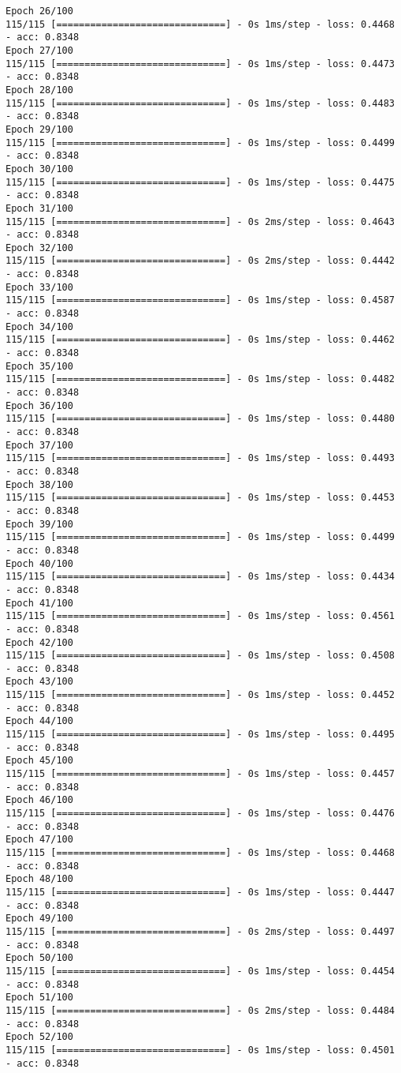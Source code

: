 \documentclass[11pt]{article}
\begin{document}
\begin{Verbatim}[commandchars=\\\{\}]
Epoch 26/100
115/115 [==============================] - 0s 1ms/step - loss: 0.4468 - acc: 0.8348
Epoch 27/100
115/115 [==============================] - 0s 1ms/step - loss: 0.4473 - acc: 0.8348
Epoch 28/100
115/115 [==============================] - 0s 1ms/step - loss: 0.4483 - acc: 0.8348
Epoch 29/100
115/115 [==============================] - 0s 1ms/step - loss: 0.4499 - acc: 0.8348
Epoch 30/100
115/115 [==============================] - 0s 1ms/step - loss: 0.4475 - acc: 0.8348
Epoch 31/100
115/115 [==============================] - 0s 2ms/step - loss: 0.4643 - acc: 0.8348
Epoch 32/100
115/115 [==============================] - 0s 2ms/step - loss: 0.4442 - acc: 0.8348
Epoch 33/100
115/115 [==============================] - 0s 1ms/step - loss: 0.4587 - acc: 0.8348
Epoch 34/100
115/115 [==============================] - 0s 1ms/step - loss: 0.4462 - acc: 0.8348
Epoch 35/100
115/115 [==============================] - 0s 1ms/step - loss: 0.4482 - acc: 0.8348
Epoch 36/100
115/115 [==============================] - 0s 1ms/step - loss: 0.4480 - acc: 0.8348
Epoch 37/100
115/115 [==============================] - 0s 1ms/step - loss: 0.4493 - acc: 0.8348
Epoch 38/100
115/115 [==============================] - 0s 1ms/step - loss: 0.4453 - acc: 0.8348
Epoch 39/100
115/115 [==============================] - 0s 1ms/step - loss: 0.4499 - acc: 0.8348
Epoch 40/100
115/115 [==============================] - 0s 1ms/step - loss: 0.4434 - acc: 0.8348
Epoch 41/100
115/115 [==============================] - 0s 1ms/step - loss: 0.4561 - acc: 0.8348
Epoch 42/100
115/115 [==============================] - 0s 1ms/step - loss: 0.4508 - acc: 0.8348
Epoch 43/100
115/115 [==============================] - 0s 1ms/step - loss: 0.4452 - acc: 0.8348
Epoch 44/100
115/115 [==============================] - 0s 1ms/step - loss: 0.4495 - acc: 0.8348
Epoch 45/100
115/115 [==============================] - 0s 1ms/step - loss: 0.4457 - acc: 0.8348
Epoch 46/100
115/115 [==============================] - 0s 1ms/step - loss: 0.4476 - acc: 0.8348
Epoch 47/100
115/115 [==============================] - 0s 1ms/step - loss: 0.4468 - acc: 0.8348
Epoch 48/100
115/115 [==============================] - 0s 1ms/step - loss: 0.4447 - acc: 0.8348
Epoch 49/100
115/115 [==============================] - 0s 2ms/step - loss: 0.4497 - acc: 0.8348
Epoch 50/100
115/115 [==============================] - 0s 1ms/step - loss: 0.4454 - acc: 0.8348
Epoch 51/100
115/115 [==============================] - 0s 2ms/step - loss: 0.4484 - acc: 0.8348
Epoch 52/100
115/115 [==============================] - 0s 1ms/step - loss: 0.4501 - acc: 0.8348

\end{Verbatim}
\end{document}

